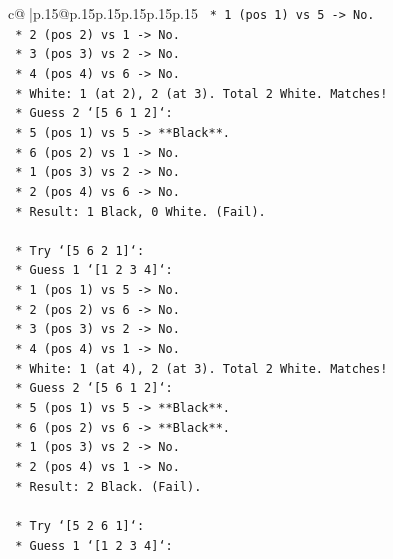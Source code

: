 \documentclass{article}
\begin{document}
{\begin{supertabular}{c@{$\;$}|p{.15\linewidth}@{}p{.15\linewidth}p{.15\linewidth}p{.15\linewidth}p{.15\linewidth}p{.15\linewidth}}
{{{\texttt{                    *   1 (pos 1) vs 5 {-}> No.} \\
\texttt{                    *   2 (pos 2) vs 1 {-}> No.} \\
\texttt{                    *   3 (pos 3) vs 2 {-}> No.} \\
\texttt{                    *   4 (pos 4) vs 6 {-}> No.} \\
\texttt{                    *   White: 1 (at 2), 2 (at 3). Total 2 White. Matches!} \\
\texttt{                *   Guess 2 `{[}5 6 1 2{]}`:} \\
\texttt{                    *   5 (pos 1) vs 5 {-}> **Black**.} \\
\texttt{                    *   6 (pos 2) vs 1 {-}> No.} \\
\texttt{                    *   1 (pos 3) vs 2 {-}> No.} \\
\texttt{                    *   2 (pos 4) vs 6 {-}> No.} \\
\texttt{                    *   Result: 1 Black, 0 White. (Fail).} \\
\\ 
\texttt{    *   Try `{[}5 6 2 1{]}`:} \\
\texttt{        *   Guess 1 `{[}1 2 3 4{]}`:} \\
\texttt{            *   1 (pos 1) vs 5 {-}> No.} \\
\texttt{            *   2 (pos 2) vs 6 {-}> No.} \\
\texttt{            *   3 (pos 3) vs 2 {-}> No.} \\
\texttt{            *   4 (pos 4) vs 1 {-}> No.} \\
\texttt{            *   White: 1 (at 4), 2 (at 3). Total 2 White. Matches!} \\
\texttt{        *   Guess 2 `{[}5 6 1 2{]}`:} \\
\texttt{            *   5 (pos 1) vs 5 {-}> **Black**.} \\
\texttt{            *   6 (pos 2) vs 6 {-}> **Black**.} \\
\texttt{            *   1 (pos 3) vs 2 {-}> No.} \\
\texttt{            *   2 (pos 4) vs 1 {-}> No.} \\
\texttt{            *   Result: 2 Black. (Fail).} \\
\\ 
\texttt{    *   Try `{[}5 2 6 1{]}`:} \\
\texttt{        *   Guess 1 `{[}1 2 3 4{]}`:} \\
}}}
\end{supertabular}}
\end{document}
